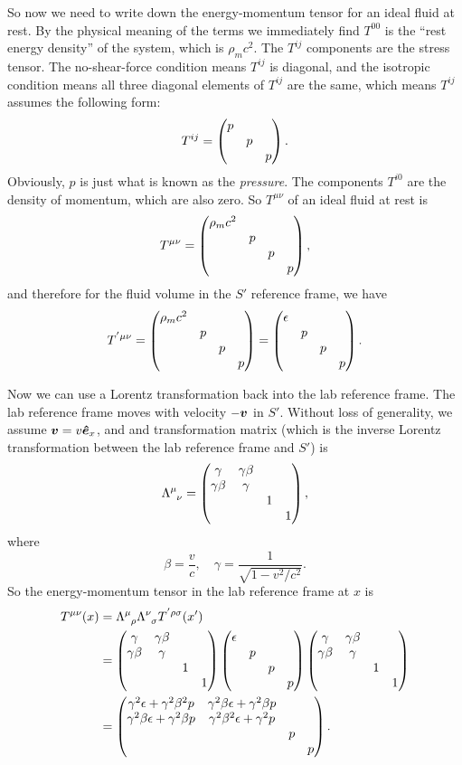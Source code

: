 \documentclass[hyperref, a4paper]{article}
\begin{document}
So now we need to write down the energy-momentum tensor for an ideal fluid at rest. By the physical meaning of 
the terms we immediately find $T^{00}$ is the ``rest energy density'' of the system, which is $\rho_m c^2$.
The $T^{ij}$ components are the stress tensor. The no-shear-force condition means $T^{ij}$ is diagonal, and the 
isotropic condition means all three diagonal elements of $T^{ij}$ are the same, which means $T^{ij}$ assumes 
the following form:
\begin{equation}
    T^{ij} = \pmqty{\dmat{p, p, p}}.
\end{equation}
Obviously, $p$ is just what is known as the \emph{pressure}. The components $T^{i0}$ are the density of momentum,
which are also zero. So $T^{\mu \nu}$ of an ideal fluid at rest is 
\begin{equation}
    T^{\mu \nu} = \pmqty{\dmat{\rho_m c^2, p, p, p}},
\end{equation}
and therefore for the fluid volume in the $S'$ reference frame, we have 
\begin{equation}
    T^{' \mu \nu} = \pmqty{\dmat{\rho_m c^2, p, p, p}} = \pmqty{\dmat{\epsilon, p, p, p}} .
\end{equation}

Now we can use a Lorentz transformation back into the lab reference frame. The lab reference frame moves with 
velocity $- \vb*{v}$ in $S'$. Without loss of generality, we assume $\vb*{v} = v \vu*{e}_x$, and and transformation
matrix (which is the inverse Lorentz transformation between the lab reference frame and $S'$) is 
\begin{equation}
    \Lambda\indices{^\mu_\nu} = \pmqty{\dmat{\gamma & \gamma \beta \\ \gamma \beta & \gamma, 1, 1}},
\end{equation}
where 
\begin{equation}
    \beta = \frac{v}{c}, \quad \gamma = \frac{1}{\sqrt{1 - v^2 / c^2}}.
\end{equation}
So the energy-momentum tensor in the lab reference frame at $x$ is 
\begin{equation}
    \begin{aligned}
        T^{\mu \nu}(x) &= \Lambda\indices{^\mu_\rho} \Lambda\indices{^\nu_\sigma} T^{' \rho \sigma}(x') \\
        &= \pmqty{\dmat{\gamma & \gamma \beta \\ \gamma \beta & \gamma, 1, 1}} \pmqty{\dmat{\epsilon, p, p, p}} \pmqty{\dmat{\gamma & \gamma \beta \\ \gamma \beta & \gamma, 1, 1}} \\
        &= \pmqty{\dmat{ \gamma^2 \epsilon + \gamma^2 \beta^2 p & \gamma^2 \beta \epsilon + \gamma^2 \beta p \\ \gamma^2 \beta \epsilon + \gamma^2 \beta p & \gamma^2 \beta^2 \epsilon + \gamma^2 p , p, p}}.
    \end{aligned}
    \label{eq:t-in-beta-gamma}
\end{equation} 
\end{document}
